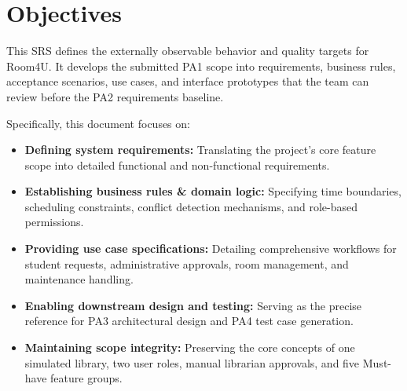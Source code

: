 \section{Objectives}
This SRS defines the externally observable behavior and quality targets for Room4U. It develops the submitted PA1 scope into requirements, business rules, acceptance scenarios, use cases, and interface prototypes that the team can review before the PA2 requirements baseline.

Specifically, this document focuses on:
\begin{itemize}[leftmargin=1.5em,itemsep=2pt,topsep=2pt]
  \item \textbf{Defining system requirements:} Translating the project's core feature scope into detailed functional and non-functional requirements.
  \item \textbf{Establishing business rules \& domain logic:} Specifying time boundaries, scheduling constraints, conflict detection mechanisms, and role-based permissions.
  \item \textbf{Providing use case specifications:} Detailing comprehensive workflows for student requests, administrative approvals, room management, and maintenance handling.
  \item \textbf{Enabling downstream design and testing:} Serving as the precise reference for PA3 architectural design and PA4 test case generation.
  \item \textbf{Maintaining scope integrity:} Preserving the core concepts of one simulated library, two user roles, manual librarian approvals, and five Must-have feature groups.
\end{itemize}

